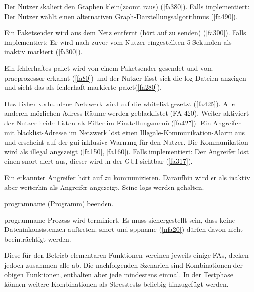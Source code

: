 \begin{description}[style=multiline, leftmargin=4cm, labelwidth=4cm]
   Der Nutzer skaliert den Graphen klein(zoomt raus) (\ref{fa380}). Falls implementiert: Der Nutzer wählt einen alternativen Graph-Darstellungsalgorithmus (\ref{fa490}).

   Ein Paketsender wird aus dem Netz entfernt (hört auf zu senden) (\ref{fa300}). Falls implementiert: Er wird nach zuvor vom Nutzer eingestellten 5 Sekunden als inaktiv markiert (\ref{fa300}).

   Ein fehlerhaftes \gls{paket} wird von einem Paketsender gesendet und vom \gls{praeprozessor} erkannt (\ref{fa80}) und der Nutzer lässt sich die \gls{log}-Dateien anzeigen und sieht das als fehlerhaft markierte \gls{paket}(\ref{fa280}).

   Das bisher vorhandene Netzwerk wird auf die \gls{whitelist} gesetzt (\ref{fa425}). Alle anderen möglichen Adress-Räume werden geblacklistet (FA 420). Weiter aktiviert der Nutzer beide Listen als Filter im Einstellungsmenü (\ref{fa427}). Ein Angreifer mit \gls{blacklist}-Adresse im Netzwerk löst einen Illegale-Kommunikation-Alarm aus und erscheint auf der \gls{gui} inklusive Warnung für den Nutzer. Die Kommunikation wird als illegal angezeigt (\ref{fa150}, \ref{fa160}). Falls implementiert: Der Angreifer löst einen \gls{snort}-\gls{alert} aus, dieser wird in der GUI sichtbar (\ref{fa317}).

   Ein erkannter Angreifer hört auf zu kommunizieren. Daraufhin wird er als inaktiv aber weiterhin als Angreifer angezeigt. Seine \glspl{log} werden gehalten.

   \gls{programname} (Programm) beenden.

   \gls{programname}-Prozess wird terminiert. Es muss sichergestellt sein, dass keine Dateninkonsistenzen auftreten. \gls{snort} und \gls{sppname} (\ref{nfa20}) dürfen davon nicht beeinträchtigt werden.

\end{description}

\par
Diese für den Betrieb elementaren Funktionen vereinen jeweils einige FAs, decken jedoch zusammen alle ab. Die nachfolgenden Szenarien sind Kombinationen der obigen Funktionen, enthalten aber jede mindestens einmal. In der Testphase können weitere Kombinationen als Stresstests beliebig hinzugefügt werden.

